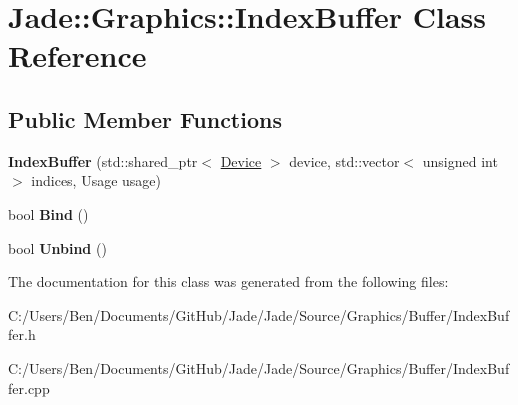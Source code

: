 \hypertarget{class_jade_1_1_graphics_1_1_index_buffer}{}\section{Jade\+:\+:Graphics\+:\+:Index\+Buffer Class Reference}
\label{class_jade_1_1_graphics_1_1_index_buffer}
\subsection*{Public Member Functions}
\begin{DoxyCompactItemize}
\item 
\hypertarget{class_jade_1_1_graphics_1_1_index_buffer_a5ee1d8d465fb994fd7ddbe24e3f1ac3e}{}{\bfseries Index\+Buffer} (std\+::shared\+\_\+ptr$<$ \hyperlink{class_jade_1_1_graphics_1_1_device}{Device} $>$ device, std\+::vector$<$ unsigned int $>$ indices, Usage usage)\label{class_jade_1_1_graphics_1_1_index_buffer_a5ee1d8d465fb994fd7ddbe24e3f1ac3e}

\item 
\hypertarget{class_jade_1_1_graphics_1_1_index_buffer_a0020156990c8c19bc17ebe6c5340866c}{}bool {\bfseries Bind} ()\label{class_jade_1_1_graphics_1_1_index_buffer_a0020156990c8c19bc17ebe6c5340866c}

\item 
\hypertarget{class_jade_1_1_graphics_1_1_index_buffer_a0d8c31d5335824573cf287a3e5ea8272}{}bool {\bfseries Unbind} ()\label{class_jade_1_1_graphics_1_1_index_buffer_a0d8c31d5335824573cf287a3e5ea8272}

\end{DoxyCompactItemize}


The documentation for this class was generated from the following files\+:\begin{DoxyCompactItemize}
\item 
C\+:/\+Users/\+Ben/\+Documents/\+Git\+Hub/\+Jade/\+Jade/\+Source/\+Graphics/\+Buffer/Index\+Buffer.\+h\item 
C\+:/\+Users/\+Ben/\+Documents/\+Git\+Hub/\+Jade/\+Jade/\+Source/\+Graphics/\+Buffer/Index\+Buffer.\+cpp\end{DoxyCompactItemize}
